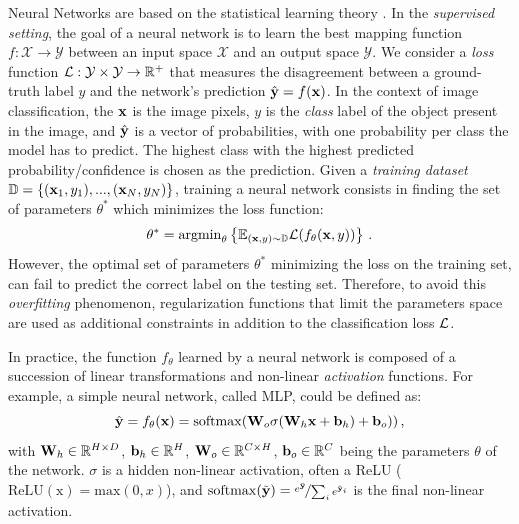 Neural Networks are based on the statistical learning theory \citep{vapnik1999statstheory}. In the
\textit{supervised setting}, the goal of a neural network is to learn the best mapping function $f :
      \mathcal{X} \rightarrow \mathcal{Y}$ between an input space $\mathcal{X}$ and an output space
$\mathcal{Y}$.  We consider a \textit{loss} function $\mathcal{L} : \mathcal{Y} \times \mathcal{Y} \rightarrow
      \mathbb{R}^+$ that measures the disagreement between a ground-truth label $y$ and the network's
prediction $\hat{\mathbf{y}} = f(\mathbf{x})$. In the context of image classification, the $\mathbf{x}$ is the image
pixels, $y$ is the \textit{class} label of the object present in the image, and $\hat{\mathbf{y}}$ is a
vector of probabilities, with one probability per class the model has to predict. The highest class
with the highest predicted probability/confidence is chosen as the prediction.
Given a \textit{training dataset} $\mathbb{D} = \{(\mathbf{x}_1, y_1), ..., (\mathbf{x}_N, y_N)\}$, training a neural network
consists in finding the set of parameters $\theta^*$ which minimizes the loss function:
%
\begin{equation}
      \theta^* = \operatorname{argmin}_{\theta} \left \{ \mathbb{E}_{(\mathbf{x},y) \sim \mathbb{D}} \mathcal{L}(f_\theta(\mathbf{x}, y))\right \}\,.
      \label{eq:intro_optim}
\end{equation}
%
However, the optimal set of parameters $\theta^*$ minimizing the loss on the training set, can fail
to predict the correct label on the testing set. Therefore, to avoid this \textit{overfitting} phenomenon,
regularization functions that limit the parameters space are used as additional constraints in addition
to the classification loss $\mathcal{L}$.

In practice, the function $f_\theta$ learned by a neural network is composed of a succession of linear
transformations and non-linear \textit{activation} functions. For example, a simple neural network,
called \ac{MLP}, could be defined as:
%
\begin{equation}
      \hat{\mathbf{y}} = f_\theta(\mathbf{x}) = \operatorname{softmax}(\mathbf{W}_o \sigma(\mathbf{W}_h \mathbf{x} + \mathbf{b}_h) + \mathbf{b}_o))\,,
      \label{eq:intro_mlp}
\end{equation}
%
\noindent with $\mathbf{W}_h \in \mathbb{R}^{H \times D}$, $\mathbf{b}_h \in \mathbb{R}^{H}$, $\mathbf{W}_o \in
      \mathbb{R}^{C \times H}$, $\mathbf{b}_o \in \mathbb{R}^{C}$ being the parameters $\theta$ of the
network. $\sigma$ is a hidden non-linear activation, often a \ac{ReLU}
($\operatorname{ReLU(x)} = \text{max}(0, x)$), and $\operatorname{softmax}(\tilde{\mathbf{y}}) =
      \nicefrac{e^{\tilde{\mathbf{y}}}}{\sum_{i} e^{\tilde{\mathbf{y}}_i}}$ is the final non-linear activation.


